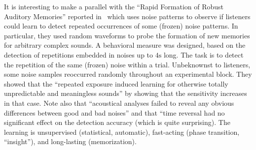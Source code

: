 \documentclass[brainsci, %
               review,submit,pdftex,moreauthors
               ]{Definitions/mdpi}
\begin{document}
It is interesting to make a parallel with the ``Rapid Formation of Robust Auditory Memories'' reported in~\citep{agus_rapid_2010} which uses noise patterns to observe if listeners could learn to detect repeated occurrences of some (frozen) noise patterns. In particular, they used random waveforms to probe the formation of new memories for arbitrary complex sounds. A behavioral measure was designed, based on the detection of repetitions embedded in noises up to $4 \si{\second}$ long. The task is to detect the repetition of the same (frozen) noise within a trial. Unbeknownst to listeners, some noise samples reoccurred randomly throughout an experimental block. They showed that the ``repeated exposure induced learning for otherwise totally unpredictable and meaningless sounds'' by showing that the sensitivity increases in that case. Note also that ``acoustical analyses failed to reveal any obvious differences between good and bad noises'' and that ``time reversal had no significant effect on the detection accuracy (which is quite surprising). The learning is unsupervised (statistical, automatic), fast-acting (phase transition, ``insight''), and long-lasting (memorization). 
\end{document}
